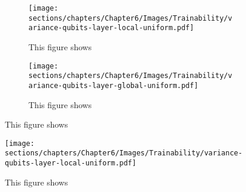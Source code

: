 \begin{figure}[h]
    \centering
    \begin{subfigure}[b]{0.6\textwidth}
        \texttt{[image: sections/chapters/Chapter6/Images/Trainability/variance-qubits-layer-local-uniform.pdf]}
    \caption{This figure shows}
    \end{subfigure}
    \begin{subfigure}[b]{0.6\textwidth}
        \texttt{[image: sections/chapters/Chapter6/Images/Trainability/variance-qubits-layer-global-uniform.pdf]}
    \caption{This figure shows}
    \end{subfigure}
    \label{fig:local-uniform}
\end{figure}





\begin{figure}[h]
    \centering
    \texttt{[image: sections/chapters/Chapter6/Images/Trainability/variance-qubits-layer-local-uniform.pdf]}
    \caption{This figure shows}
    \label{fig:local-gauss}
\end{figure}